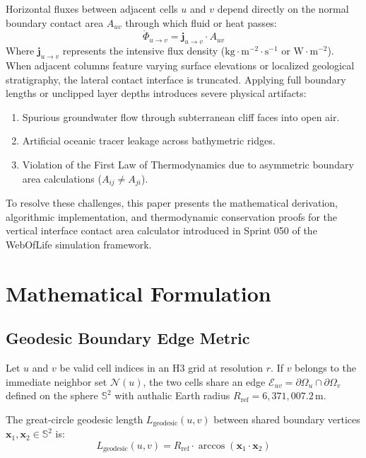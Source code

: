 \documentclass[11pt,a4paper]{article}
\theoremstyle{definition}
\begin{document}
Horizontal fluxes between adjacent cells $u$ and $v$ depend directly on the normal boundary contact area $A_{uv}$ through which fluid or heat passes:
\begin{equation}
\dot{\Phi}_{u \to v} = \mathbf{j}_{u \to v} \cdot A_{uv}
\end{equation}
Where $\mathbf{j}_{u \to v}$ represents the intensive flux density ($\text{kg} \cdot \text{m}^{-2} \cdot \text{s}^{-1}$ or $\text{W} \cdot \text{m}^{-2}$). When adjacent columns feature varying surface elevations or localized geological stratigraphy, the lateral contact interface is truncated. Applying full boundary lengths or unclipped layer depths introduces severe physical artifacts:
\begin{enumerate}
    \item Spurious groundwater flow through subterranean cliff faces into open air.
    \item Artificial oceanic tracer leakage across bathymetric ridges.
    \item Violation of the First Law of Thermodynamics due to asymmetric boundary area calculations ($A_{ij} \neq A_{ji}$).
\end{enumerate}

To resolve these challenges, this paper presents the mathematical derivation, algorithmic implementation, and thermodynamic conservation proofs for the vertical interface contact area calculator introduced in Sprint 050 of the WebOfLife simulation framework.

\section{Mathematical Formulation}

\subsection{Geodesic Boundary Edge Metric}
Let $u$ and $v$ be valid cell indices in an H3 grid at resolution $r$. If $v$ belongs to the immediate neighbor set $\mathcal{N}(u)$, the two cells share an edge $\mathcal{E}_{uv} = \partial \Omega_u \cap \partial \Omega_v$ defined on the sphere $\mathbb{S}^2$ with authalic Earth radius $R_{\text{ref}} = 6{,}371{,}007.2\,\text{m}$.

The great-circle geodesic length $L_{\text{geodesic}}(u, v)$ between shared boundary vertices $\mathbf{x}_1, \mathbf{x}_2 \in \mathbb{S}^2$ is:
\begin{equation}
L_{\text{geodesic}}(u, v) = R_{\text{ref}} \cdot \arccos\left(\mathbf{x}_1 \cdot \mathbf{x}_2\right)
\end{equation}
\end{document}
